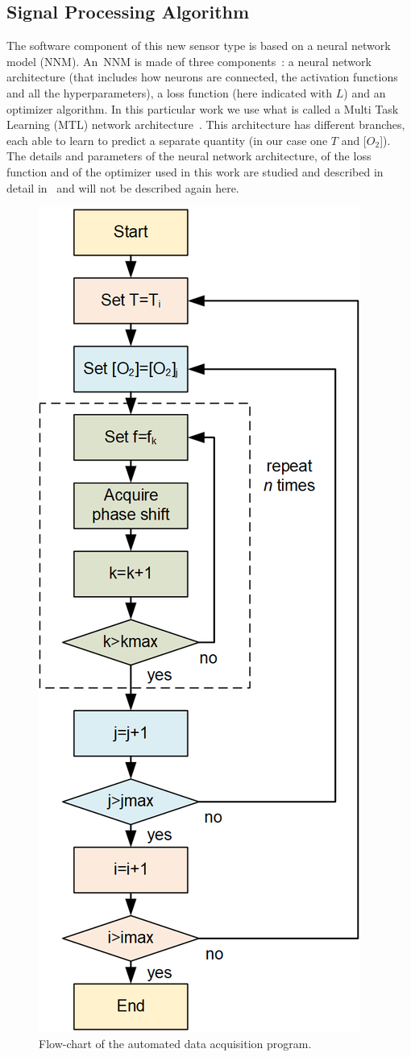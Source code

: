 \documentclass[sensors,article,accept,moreauthors,pdftex,10pt,a4paper]{Definitions/mdpi}
\theoremstyle{definition}
\begin{document}
\subsection{Signal Processing Algorithm}
\label{NN}

The software component of this new sensor type is based on a neural network model (NNM). An~NNM is made of three components~\cite{Michelucci2017}: a neural network architecture (that includes how neurons are connected, the activation functions and all the hyperparameters), a loss function (here indicated with $L$) and an optimizer algorithm. In this particular work we use what is called a Multi Task Learning (MTL) network architecture~\cite{Caruana1997}. This architecture has different branches, each able to learn to predict a separate quantity (in our case one $T$ and [$O_2$]). 
The details and parameters of the neural network architecture, of the loss function and of the optimizer used in this work are studied and described in detail in~\cite{Michelucci2019_2} and will not be described again here.

\begin{figure}[H]
\centering
\includegraphics[keepaspectratio, width=5.8 cm]{flow-chart.png}
\caption{Flow-chart of the automated data acquisition program.}
\label{fig:auto-data}
\end{figure}
\end{document}
